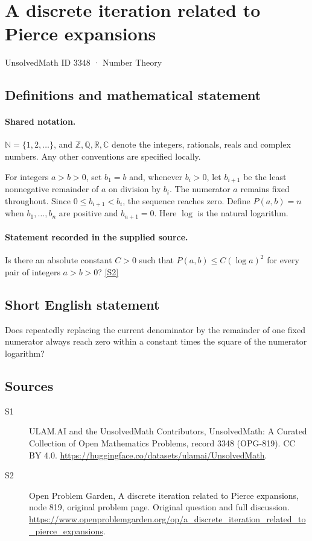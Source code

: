 \documentclass[11pt]{article}
\newcommand{\sref}[2]{\hyperlink{source:#1:#2}{[S#2]}}
\begin{document}
\setcounter{section}{3347}
\section{A discrete iteration related to Pierce expansions}\label{3348}
{\small\sffamily UnsolvedMath ID 3348 · Number Theory}
\subsection{Definitions and mathematical statement}

\paragraph{Shared notation.}$\mathbb N=\{1,2,\ldots\}$, and $\mathbb Z,\mathbb Q,\mathbb R,\mathbb C$ denote the integers, rationals, reals and complex numbers. Any other conventions are specified locally.


For integers $a>b>0$, set $b_1=b$ and, whenever $b_i>0$, let $b_{i+1}$ be the least nonnegative remainder of $a$ on division by $b_i$. The numerator $a$ remains fixed throughout. Since $0\leq b_{i+1}<b_i$, the sequence reaches zero. Define $P(a,b)=n$ when $b_1,\ldots,b_n$ are positive and $b_{n+1}=0$. Here $\log$ is the natural logarithm.
\paragraph{Statement recorded in the supplied source.}
Is there an absolute constant $C>0$ such that $P(a,b)\leq C(\log a)^2$ for every pair of integers $a>b>0$? \sref{3348}{2}
\subsection{Short English statement}
Does repeatedly replacing the current denominator by the remainder of one fixed numerator always reach zero within a constant times the square of the numerator logarithm?
\subsection{Sources}
\begin{description}
\item[\hypertarget{source:3348:1}{S1}] ULAM.AI and the UnsolvedMath Contributors, UnsolvedMath: A Curated Collection of Open Mathematics Problems, record 3348 (OPG-819). CC BY 4.0. \url{https://huggingface.co/datasets/ulamai/UnsolvedMath}.
\item[\hypertarget{source:3348:2}{S2}] Open Problem Garden, A discrete iteration related to Pierce expansions, node 819, original problem page. Original question and full discussion. \url{https://www.openproblemgarden.org/op/a_discrete_iteration_related_to_pierce_expansions}.

\end{description}
\label{end:3348}
\end{document}
